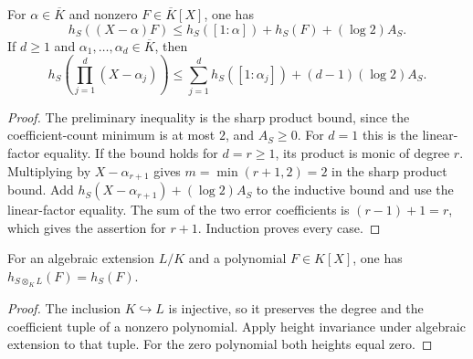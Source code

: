 \begin{lemma}
\label{lem:polynomial-height-split-bound}
\leanok
For $\alpha\in\overline K$ and nonzero $F\in\overline K[X]$, one has
\[
 h_S((X-\alpha)F)\leq h_S([1:\alpha])+h_S(F)+(\log2)A_S.
\]
If $d\geq1$ and $\alpha_1,\ldots,\alpha_d\in\overline K$, then
\[
 h_S\left(\prod_{j=1}^d(X-\alpha_j)\right)
 \leq\sum_{j=1}^d h_S([1:\alpha_j])+(d-1)(\log2)A_S.
\]
\end{lemma}
\begin{proof}
The preliminary inequality is the sharp product bound, since the
coefficient-count minimum is at most $2$, and $A_S\geq0$.
For $d=1$ this is the linear-factor equality. If the bound holds
for $d=r\geq1$, its product is monic of degree $r$. Multiplying
by $X-\alpha_{r+1}$ gives $m=\min(r+1,2)=2$ in the sharp
product bound. Add $h_S(X-\alpha_{r+1})+(\log2)A_S$ to the
inductive bound and use the linear-factor equality. The sum of the
two error coefficients is $(r-1)+1=r$, which gives the assertion
for $r+1$. Induction proves every case.
\end{proof}

\begin{lemma}
\label{lem:polynomial-height-base-extension}
\leanok
For an algebraic extension $L/K$ and a polynomial $F\in K[X]$,
one has $h_{S\otimes_K L}(F)=h_S(F)$.
\end{lemma}
\begin{proof}
The inclusion $K\hookrightarrow L$ is injective, so it preserves
the degree and the coefficient tuple of a nonzero polynomial.
Apply height invariance under algebraic extension to that tuple.
For the zero polynomial both heights equal zero.
\end{proof}

